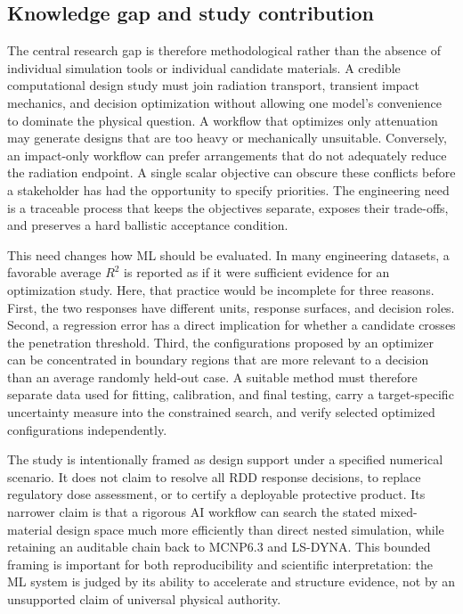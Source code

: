 \documentclass[12pt]{elsarticle}
\begin{document}
	\subsection{Knowledge gap and study contribution}

	The central research gap is therefore methodological rather than the absence of individual simulation tools or individual candidate materials. A credible computational design study must join radiation transport, transient impact mechanics, and decision optimization without allowing one model's convenience to dominate the physical question. A workflow that optimizes only attenuation may generate designs that are too heavy or mechanically unsuitable. Conversely, an impact-only workflow can prefer arrangements that do not adequately reduce the radiation endpoint. A single scalar objective can obscure these conflicts before a stakeholder has had the opportunity to specify priorities. The engineering need is a traceable process that keeps the objectives separate, exposes their trade-offs, and preserves a hard ballistic acceptance condition.
	
	This need changes how ML should be evaluated. In many engineering datasets, a favorable average $R^2$ is reported as if it were sufficient evidence for an optimization study. Here, that practice would be incomplete for three reasons. First, the two responses have different units, response surfaces, and decision roles. Second, a regression error has a direct implication for whether a candidate crosses the penetration threshold. Third, the configurations proposed by an optimizer can be concentrated in boundary regions that are more relevant to a decision than an average randomly held-out case. A suitable method must therefore separate data used for fitting, calibration, and final testing, carry a target-specific uncertainty measure into the constrained search, and verify selected optimized configurations independently.
	
	The study is intentionally framed as design support under a specified numerical scenario. It does not claim to resolve all RDD response decisions, to replace regulatory dose assessment, or to certify a deployable protective product. Its narrower claim is that a rigorous AI workflow can search the stated mixed-material design space much more efficiently than direct nested simulation, while retaining an auditable chain back to MCNP6.3 and LS-DYNA. This bounded framing is important for both reproducibility and scientific interpretation: the ML system is judged by its ability to accelerate and structure evidence, not by an unsupported claim of universal physical authority.
	
\end{document}
